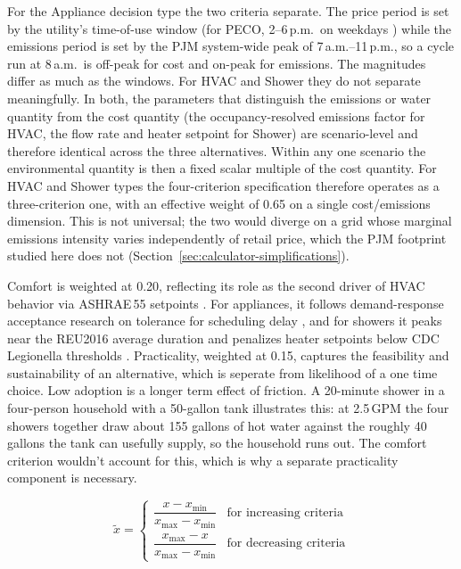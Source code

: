 \documentclass[final,3p,times]{elsarticle}
\begin{document}
For the Appliance decision type the two criteria separate. The price period is set by the utility's time-of-use window (for PECO, 2--6\,p.m.\ on weekdays \cite{peco2021}) while the emissions period is set by the PJM system-wide peak of 7\,a.m.--11\,p.m., so a cycle run at 8\,a.m.\ is off-peak for cost and on-peak for emissions. The magnitudes differ as much as the windows. For HVAC and Shower they do not separate meaningfully. In both, the parameters that distinguish the emissions or water quantity from the cost quantity (the occupancy-resolved emissions factor for HVAC, the flow rate and heater setpoint for Shower) are scenario-level and therefore identical across the three alternatives. Within any one scenario the environmental quantity is then a fixed scalar multiple of the cost quantity. For HVAC and Shower types the four-criterion specification therefore operates as a three-criterion one, with an effective weight of 0.65 on a single cost/emissions dimension. This is not universal; the two would diverge on a grid whose marginal emissions intensity varies independently of retail price, which the PJM footprint studied here does not (Section~\ref{sec:calculator-simplifications}).

Comfort is weighted at 0.20, reflecting its role as the second driver of HVAC behavior \cite{aqilah2022} via ASHRAE\,55 setpoints \cite{ashrae55_2020}. For appliances, it follows demand-response acceptance research on tolerance for scheduling delay \cite{paetz2012,waseem2020}, and for showers it peaks near the REU2016 average duration and penalizes heater setpoints below CDC Legionella thresholds \cite{reu2016,harrispoll2024,cdc2026}. Practicality, weighted at 0.15, captures the feasibility and sustainability of an alternative, which is seperate from likelihood of a one time choice. Low adoption is a longer term effect of friction. A 20-minute shower in a four-person household with a 50-gallon tank illustrates this: at 2.5\,GPM the four showers together draw about 155 gallons of hot water against the roughly 40 gallons the tank can usefully supply, so the household runs out. The comfort criterion wouldn't account for this, which is why a separate practicality component is necessary.

\begin{equation}
\label{eq:norm_x}
\tilde{x} =
\begin{cases}
\dfrac{x - x_{\min}}{x_{\max} - x_{\min}} & \text{for increasing criteria}\\[4mm]
\dfrac{x_{\max} - x}{x_{\max} - x_{\min}} & \text{for decreasing criteria}
\end{cases}
\end{equation}
\end{document}
